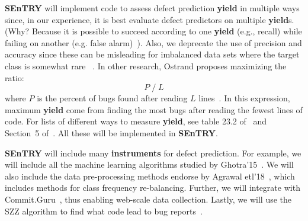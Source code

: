 \documentclass{NSF}
\newcommand{\IT}{{\bf {\sffamily SEnTRY}}}
\begin{document}
\begin{nsfdescription}
{\IT} will implement code to assess
defect prediction  {\bf yield} in multiple ways
since,
in our experience,
it is best  evaluate defect predictors on multiple {\bf yield}s.
(Why? Because it is possible to succeed according
to one   {\bf yield}   (e.g., recall)
while failing on another (e.g. false alarm)~\cite{fu2016tuning}). Also,
we deprecate the use of  precision and accuracy since these can be misleading for imbalanced data sets where the target class is somewhat
rare ~\cite{Menzies:2007prec}. 
In other research, Ostrand proposes maximizing the ratio:
\begin{equation}\label{eq:ostrand}P\;/\;L\end{equation}
where $P$ is the percent of bugs found after reading  $L$ lines~\cite{Ostrand:2004}. In this
expression, maximum
{\bf yield} come from finding the most bugs after reading the fewest lines of code. 
For lists of different ways to measure {\bf yield}, see table 23.2 of~\cite{menzies2014sharing} and Section~5 of~\cite{lo17_ifa}. All these will be implemented in {\IT}.

{\IT} will include
 many {\bf instruments} for  defect prediction.
 For example, we will include all the machine learning algorithms
studied by Ghotra'15~\cite{Ghotra15}.
We will also include the data pre-processing methods endorse
by Agrawal etl'18~\cite{agrawal2017better},
which includes methods for class frequency re-balancing.
Further, 
we will integrate with  Commit.Guru~\cite{commitguru},
thus enabling  
web-scale data collection. Lastly,
we will use  the SZZ algorithm to find
what code lead to bug reports~\cite{costa17szz, Kim08changes, Sliwerski05changes,RODRIGUEZPEREZ2018164}.


\end{nsfdescription}
\end{document}
